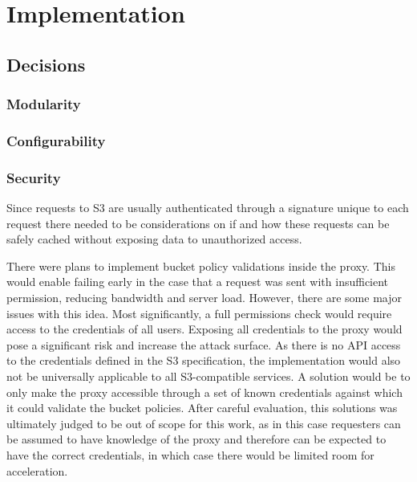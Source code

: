 \chapter{Implementation}

\section{Decisions}

\subsection{Modularity}

\subsection{Configurability}

\subsection{Security}
\label{security}

Since requests to S3 are usually authenticated through a signature unique to each request there needed to be considerations on if and how these requests can be safely cached without exposing data to unauthorized access.

There were plans to implement bucket policy validations inside the proxy. This would enable failing early in the case that a request was sent with insufficient permission, reducing bandwidth and server load. However, there are some major issues with this idea.
Most significantly, a full permissions check would require access to the credentials of all users. Exposing all credentials to the proxy would pose a significant risk and increase the attack surface. As there is no API access to the credentials defined in the S3 specification, the implementation would also not be universally applicable to all S3-compatible services.
A solution would be to only make the proxy accessible through a set of known credentials against which it could validate the bucket policies. After careful evaluation, this solutions was ultimately judged to be out of scope for this work, as in this case requesters can be assumed to have knowledge of the proxy and therefore can be expected to have the correct credentials, in which case there would be limited room for acceleration.

